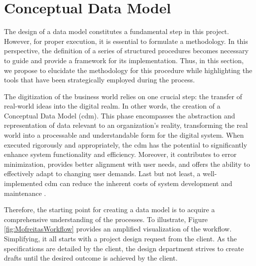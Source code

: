 \section{Conceptual Data Model}\label{section:conceptulaDataModel}

The design of a data model constitutes a fundamental step in this project. However, for proper execution, it is essential to formulate a methodology. In this perspective, the definition of a series of structured procedures becomes necessary to guide and provide a framework for its implementation. Thus, in this section, we propose to elucidate the methodology for this procedure while highlighting the tools that have been strategically employed during the process.

The digitization of the business world relies on one crucial step: the transfer of real-world ideas into the digital realm. In other words, the creation of a Conceptual Data Model (\acrshort{cdm}). This phase encompasses the abstraction and representation of data relevant to an organization's reality, transforming the real world into a processable and understandable form for the digital system. When executed rigorously and appropriately, the \acrshort{cdm} has the potential to significantly enhance system functionality and efficiency. Moreover, it contributes to error minimization, provides better alignment with user needs, and offers the ability to effectively adapt to changing user demands. Last but not least, a well-implemented \acrshort{cdm} can reduce the inherent costs of system development and maintenance \cite{Batra1995}.

Therefore, the starting point for creating a data model is to acquire a comprehensive understanding of the processes. To illustrate, Figure \ref{fig:MofreitasWorkflow} provides an amplified visualization of the workflow. Simplifying, it all starts with a project design request from the client. As the specifications are detailed by the client, the design department strives to create drafts until the desired outcome is achieved by the client.

